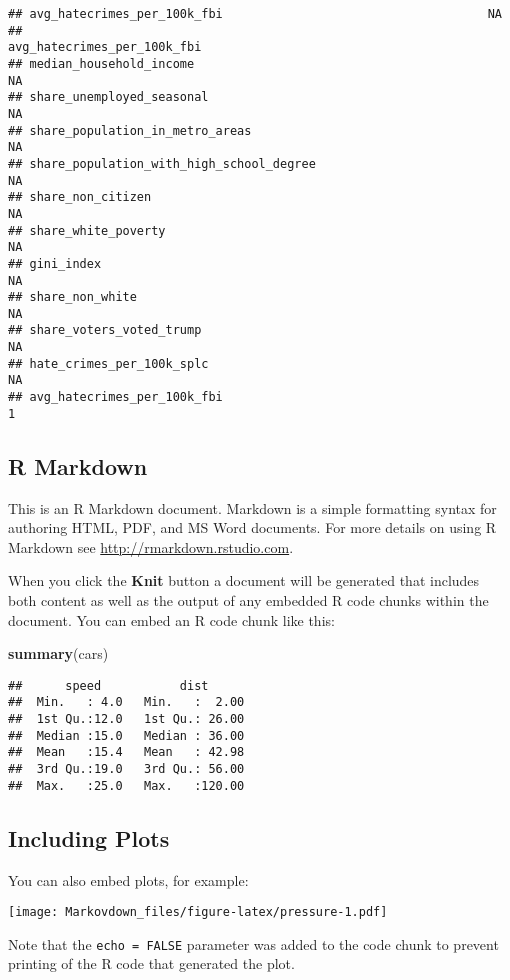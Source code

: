 \documentclass[
]{article}
\newenvironment{Shaded}{\begin{snugshade}}{\end{snugshade}}
\newcommand{\KeywordTok}[1]{\textcolor[rgb]{0.13,0.29,0.53}{\textbf{#1}}}
\newcommand{\NormalTok}[1]{#1}
\begin{document}
\begin{verbatim}
## avg_hatecrimes_per_100k_fbi                                     NA
##                                          avg_hatecrimes_per_100k_fbi
## median_household_income                                           NA
## share_unemployed_seasonal                                         NA
## share_population_in_metro_areas                                   NA
## share_population_with_high_school_degree                          NA
## share_non_citizen                                                 NA
## share_white_poverty                                               NA
## gini_index                                                        NA
## share_non_white                                                   NA
## share_voters_voted_trump                                          NA
## hate_crimes_per_100k_splc                                         NA
## avg_hatecrimes_per_100k_fbi                                        1
\end{verbatim}

\hypertarget{r-markdown}{%
\subsection{R Markdown}\label{r-markdown}}

This is an R Markdown document. Markdown is a simple formatting syntax
for authoring HTML, PDF, and MS Word documents. For more details on
using R Markdown see \url{http://rmarkdown.rstudio.com}.

When you click the \textbf{Knit} button a document will be generated
that includes both content as well as the output of any embedded R code
chunks within the document. You can embed an R code chunk like this:

\begin{Shaded}
\begin{Highlighting}[]
\KeywordTok{summary}\NormalTok{(cars)}
\end{Highlighting}
\end{Shaded}

\begin{verbatim}
##      speed           dist       
##  Min.   : 4.0   Min.   :  2.00  
##  1st Qu.:12.0   1st Qu.: 26.00  
##  Median :15.0   Median : 36.00  
##  Mean   :15.4   Mean   : 42.98  
##  3rd Qu.:19.0   3rd Qu.: 56.00  
##  Max.   :25.0   Max.   :120.00
\end{verbatim}

\hypertarget{including-plots}{%
\subsection{Including Plots}\label{including-plots}}

You can also embed plots, for example:

\texttt{[image: Markovdown\_files/figure-latex/pressure-1.pdf]}

Note that the \texttt{echo\ =\ FALSE} parameter was added to the code
chunk to prevent printing of the R code that generated the plot.
\end{document}
